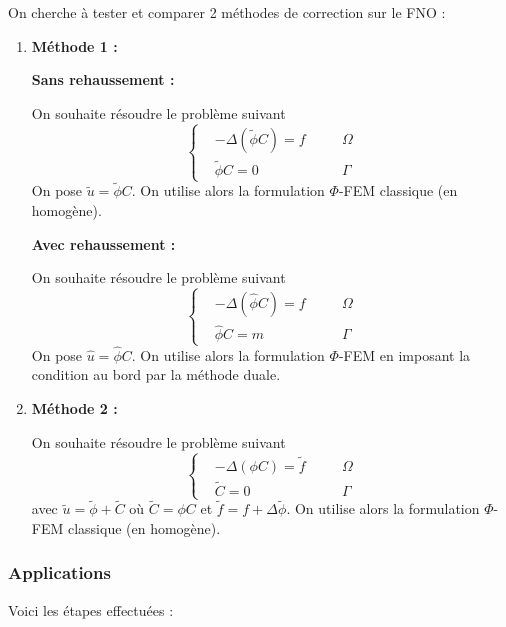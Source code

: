 On cherche à tester et comparer 2 méthodes de correction sur le FNO :

\begin{enumerate}[label=\textbullet]
	
	\item \textbf{Méthode 1 :}
	
	\textbf{Sans rehaussement :}
	
	On souhaite résoudre le problème suivant
	$$\left\{\begin{aligned}
		&-\Delta (\tilde{\phi}C)=f \quad &&\Omega \\
		&\tilde{\phi}C=0 \quad &&\Gamma
	\end{aligned}\right.$$
	On pose $\tilde{u}=\tilde{\phi}C$.
	On utilise alors la formulation $\Phi$-FEM classique (en homogène).
	
	\textbf{Avec rehaussement :}
	
	On souhaite résoudre le problème suivant
	$$\left\{\begin{aligned}
		&-\Delta (\hat{\phi}C)=f \quad &&\Omega \\
		&\hat{\phi}C=m \quad &&\Gamma
	\end{aligned}\right.$$
	On pose $\hat{u}=\hat{\phi}C$.
	On utilise alors la formulation $\Phi$-FEM en imposant la condition au bord par la méthode duale.
	
	\item \textbf{Méthode 2 :}
	
	On souhaite résoudre le problème suivant
	$$\left\{\begin{aligned}
		&-\Delta(\phi C)=\tilde{f} \quad &&\Omega \\
		&\tilde{C}=0 \quad &&\Gamma
	\end{aligned}\right.$$
	avec $\tilde{u}=\tilde{\phi}+\tilde{C}$ où $\tilde{C}=\phi C$ et $\tilde{f}=f+\Delta\tilde{\phi}$.
	On utilise alors la formulation $\Phi$-FEM classique (en homogène).
	
\end{enumerate}

\subsubsection{Applications}

Voici les étapes effectuées :

